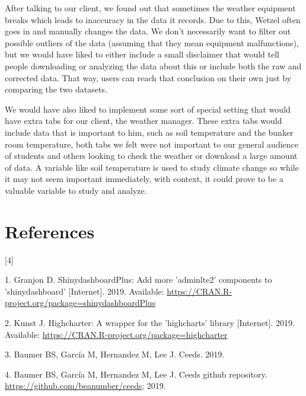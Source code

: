 \documentclass[10pt,letterpaper]{article}
\begin{document}
After talking to our client, we found out that sometimes the weather
equipment breaks which leads to inaccuracy in the data it records. Due
to this, Wetzel often goes in and manually changes the data. We don't
necessarily want to filter out possible outliers of the data (assuming
that they mean equipment malfunctions), but we would have liked to
either include a small disclaimer that would tell people downloading or
analyzing the data about this or include both the raw and corrected
data. That way, users can reach that conclusion on their own just by
comparing the two datasets.

We would have also liked to implement some sort of special setting that
would have extra tabs for our client, the weather manager. These extra
tabs would include data that is important to him, such as soil
temperature and the bunker room temperature, both tabs we felt were not
important to our general audience of students and others looking to
check the weather or download a large amount of data. A variable like
soil temperature is used to study climate change so while it may not
seem important immediately, with context, it could prove to be a
valuable variable to study and analyze.

\section*{References}\label{references}

{[}4{]}

\hypertarget{refs}{}
\hypertarget{ref-dashboardplus}{}
1. Granjon D. ShinydashboardPlus: Add more 'adminlte2' components to
'shinydashboard' {[}Internet{]}. 2019. Available:
\url{https://CRAN.R-project.org/package=shinydashboardPlus}

\hypertarget{ref-highcharter}{}
2. Kunst J. Highcharter: A wrapper for the 'highcharts' library
{[}Internet{]}. 2019. Available:
\url{https://CRAN.R-project.org/package=highcharter}

\hypertarget{ref-ceeds}{}
3. Baumer BS, García M, Hernandez M, Lee J. Ceeds. 2019.

\hypertarget{ref-ceeds_repo}{}
4. Baumer BS, García M, Hernandez M, Lee J. Ceeds github repository.
\url{https://github.com/beanumber/ceeds}; 2019.

\nolinenumbers
\end{document}
